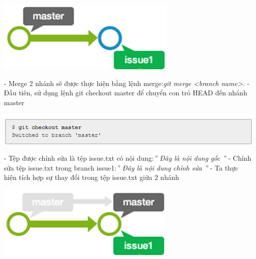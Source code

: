 \documentclass[12pt,a4paper]{report}
\begin{document}
	\includegraphics[width=0.8\linewidth]{screenshot060}

	\label{fig:screenshot060}	\vskip 0.4cm	\vskip 0.4cm

- Merge 2 nhánh sẽ được thực hiện bằng lệnh merge:{\it git merge <branch name>.}	\vskip 0.4cm 
- Đầu tiên, sử dụng lệnh git checkout master để chuyển con trỏ HEAD đến nhánh master	\vskip 0.4cm

	\includegraphics[width=0.8\linewidth]{screenshot061}

	\label{fig:screenshot061}
	\vskip 0.4cm	\vskip 0.4cm
- Tệp được chỉnh sửa là tệp issue.txt có nội dung:{\it ''  Đây là nội dung gốc ''}	\vskip 0.4cm
- Chỉnh sửa tệp issue.txt trong branch issue1:{\it '' Đây là nội dung chỉnh sửa ''}	\vskip 0.4cm
- Ta thực hiện tích hợp sự thay đổi trong tệp issue.txt giữa 2 nhánh	\vskip 0.4cm

	\includegraphics[width=0.8\linewidth]{screenshot062}
\end{document}
